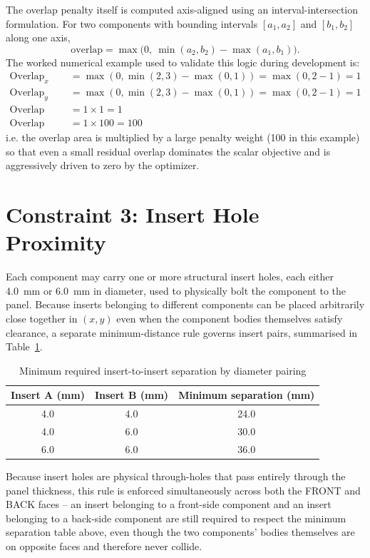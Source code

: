 \documentclass[11pt,a4paper,oneside]{report}
\begin{document}
The overlap penalty itself is computed axis-aligned using an interval-intersection formulation. For two components with bounding intervals $[a_1, a_2]$ and $[b_1, b_2]$ along one axis,
\begin{equation}
\text{overlap} = \max\big(0,\ \min(a_2, b_2) - \max(a_1, b_1)\big).
\end{equation}
The worked numerical example used to validate this logic during development is:
\begin{align}
\text{Overlap}_x &= \max(0, \min(2,3) - \max(0,1)) = \max(0, 2-1) = 1 \\
\text{Overlap}_y &= \max(0, \min(2,3) - \max(0,1)) = \max(0, 2-1) = 1 \\
\text{Overlap area} &= 1 \times 1 = 1 \\
\text{Overlap penalty} &= 1 \times 100 = 100
\end{align}
i.e. the overlap area is multiplied by a large penalty weight (100 in this example) so that even a small residual overlap dominates the scalar objective and is aggressively driven to zero by the optimizer.

\section{Constraint 3: Insert Hole Proximity}
Each component may carry one or more structural insert holes, each either 4.0~mm or 6.0~mm in diameter, used to physically bolt the component to the panel. Because inserts belonging to different components can be placed arbitrarily close together in $(x,y)$ even when the component bodies themselves satisfy clearance, a separate minimum-distance rule governs insert pairs, summarised in Table~\ref{tab:insert_rule}.

\begin{table}[H]
\centering
\caption{Minimum required insert-to-insert separation by diameter pairing}
\label{tab:insert_rule}
\begin{tabular}{|c|c|c|}
\hline
\textbf{Insert A (mm)} & \textbf{Insert B (mm)} & \textbf{Minimum separation (mm)} \\
\hline
4.0 & 4.0 & 24.0 \\ \hline
4.0 & 6.0 & 30.0 \\ \hline
6.0 & 6.0 & 36.0 \\
\hline
\end{tabular}
\end{table}

Because insert holes are physical through-holes that pass entirely through the panel thickness, this rule is enforced simultaneously across both the FRONT and BACK faces -- an insert belonging to a front-side component and an insert belonging to a back-side component are still required to respect the minimum separation table above, even though the two components' bodies themselves are on opposite faces and therefore never collide.
\end{document}
